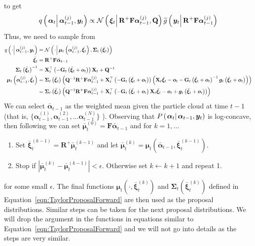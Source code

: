 \documentclass[9pt, notitlepage]{article}
\renewcommand{\vec}[1]{\bm{#1}}
\newcommand{\vecb}[1]{\bar{\vec{#1}}}
\newcommand{\mat}[1]{\mathbf{#1}}
\newcommand{\Lparen}[1]{\left( #1\right)}
\newcommand{\Lvert}[1]{\left\vert #1\right\vert}
\newcommand{\Cond}[2]{\left. #1 \vphantom{#2} \right\vert  #2}
\newcommand{\optor}[2]{#1\Lparen{#2}}
\newcommand{\optorC}[3]{\optor{#1}{\Cond{#2}{#3}}}
\newcommand{\normalC}[3]{\optorC{\mathcal{N}}{#1}{#2,#3}}
\newcommand{\IDC}[2]{\optorC{q}{#1}{#2}}
\newcommand{\partic}[3]{#1_{#2}^{\Lparen{#3}}}
\newcommand{\nPart}{N}
\begin{document}
%
%
to get%
%
\begin{equation}
	\IDC{\vec{\alpha}_t}{\partic{\vec{\alpha}}{t-1}{j}, \vec{y}_t} \propto %
		\normalC{\vec{\xi}_t}{\mat{R}^{+}\mat{F}\partic{\vec{\alpha}}{t-1}{j}}{\mat{Q}}
		\optorC{\widetilde{g}}{\vec{y}_t}{\mat{R}^{+}\mat{F}\partic{\vec{\alpha}}{t-1}{j}}
\end{equation}
%
%
Thus, we need to sample from%
%
{\scriptsize %
\begin{equation}\label{eqn:TaylorProposalForward}\begin{split}
	\IDC{\cdot}{\partic{\vec{\alpha}}{t-1}{j}, \vec{y}_t} &=  %
		\normalC{\cdot}{
			\vec{\mu}_t\Lparen{\partic{\vec{\alpha}}{t-1}{j}, \vecb{\xi}_t}
		}{
			\mat{\Sigma}_t\Lparen{\vecb{\xi}_t}
		} \\
%
	\vecb{\xi}_t &= \mat{R}^{+}\mat{F}\vecb{\alpha}_{t - 1} \\
%
	\mat{\Sigma}_t\Lparen{\vecb{\xi}_t}^{-1} &= \mat{X}_t^\top
		\Lparen{-\mat{G}_t\Lparen{\vecb{\xi}_t + \vec{o}_t}}
		\mat{X}_t + \mat{Q}^{-1}  \\
%
	\vec{\mu}_t\Lparen{\partic{\vec{\alpha}}{t-1}{j}, \vecb{\xi}_t} 
	&= \mat{\Sigma}_t\Lparen{\vecb{\xi}_t}\Lparen{
		\mat{Q}^{-1}\mat{R}^{+}\mat{F}\partic{\vec{\alpha}}{t-1}{j} +
		\mat{X}_t^\top \Lparen{-\mat{G}_t\Lparen{\vecb{\xi}_t + \vec{o}_t}}
		\Lparen{
			\mat{X}_t\vecb{\xi}_t - \vec{o}_t -
			\mat{G}_t\Lparen{\vecb{\xi}_t + \vec{o}_t}^{-1}
			\vec{g}_t\Lparen{\vecb{\xi}_t + \vec{o}_t}
		}
	} \\
%
	 &= \mat{\Sigma}_t\Lparen{\vecb{\xi}_t}\Lparen{
		\mat{Q}^{-1}\mat{R}^{+}\mat{F}\partic{\vec{\alpha}}{t-1}{j} +
		\mat{X}_t^\top
		\Lparen{
			-\mat{G}_t\Lparen{\vecb{\xi}_t + \vec{o}_t}
			\mat{X}_t\vecb{\xi}_t - \vec{o}_t +
			\vec{g}_t\Lparen{\vecb{\xi}_t + \vec{o}_t}
		}
	}
\end{split}\end{equation}
}%
%
%
We can select  $\vecb{\alpha}_{t - 1}$ as the weighted mean given the particle cloud at time $t-1$ (that is, %
$\{\partic{\vec{\alpha}}{t-1}{1}, \partic{\vec{\alpha}}{t-1}{2}, \dots \partic{\vec{\alpha}}{t-1}{\nPart}\}$%
). Observing that $\optorC{P}{\vec{\alpha}_t}{\vec{\alpha}_{t - 1}, \vec{y}_t}$ is log-concave, then following \cite{doucet00} we can set $\vecb{\mu}_t^{(0)} = \mat{F}\vecb{\alpha}_{t - 1}$ and for $k = 1, \dots$ %
%
\begin{enumerate}
  \item Set $\vecb{\xi}_t^{(k - 1)} = \mat{R}^+ \vecb{\mu}_t^{(k - 1)}$ and let $\vecb{\mu}_t^{(k)} = \vec{\mu}_t\Lparen{\vecb{\alpha}_{t - 1}, \vecb{\xi}_t^{(k-1)}}$.
  \item Stop if $\Lvert{\vecb{\mu}_t^{(k)} - \vecb{\mu}_t^{(k - 1)}} < \epsilon$. Otherwise set $k \leftarrow k + 1$ and repeat 1. 
\end{enumerate}%
%
for some small $\epsilon$. The final functions $\vec{\mu}_t\Lparen{\cdot, \vecb{\xi}_t^{(k)}}$ and $\mat{\Sigma}_t\Lparen{\vecb{\xi}_t^{(k)}}$ defined in Equation~\eqref{eqn:TaylorProposalForward} are then used as the proposal distributions. Similar steps can be taken for the next proposal distributions. We will drop the argument in the functions in equations similar to Equation~\eqref{eqn:TaylorProposalForward} and we will not go into details as the steps are very similar.
\end{document}
